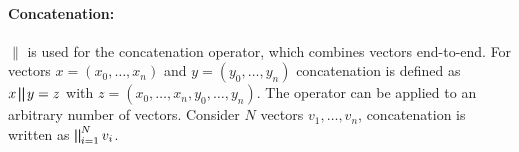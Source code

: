 \paragraph{Concatenation:}
$\parallel$ is used for the concatenation operator, which combines vectors end-to-end. 
For vectors $x=(x_0, \dots, x_n)$ and $y=(y_0, \dots, y_n)$ concatenation is defined as 
$ x \bigparallel y = z$ with $z=(x_0, \dots, x_n, y_0, \dots, y_n) $. 
The operator can be applied to an arbitrary number of vectors.
Consider $N$ vectors $v_1, \dots, v_n$, concatenation is written as  $\bigparallel^N_{i=1} v_i$.
